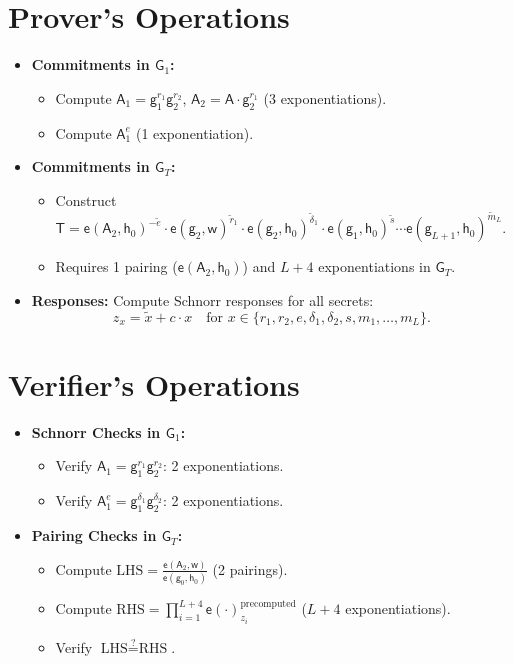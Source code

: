 {\section*{Prover's Operations}
\begin{itemize}
  \item \textbf{Commitments in $\mathsf{G}_1$:}
    \begin{itemize}
      \item Compute $\mathsf{A}_1 = \mathsf{g}_1^{r_1} \mathsf{g}_2^{r_2}$, $\mathsf{A}_2 = \mathsf{A} \cdot \mathsf{g}_2^{r_1}$ (3 exponentiations).
      \item Compute $\mathsf{A}_1^e$ (1 exponentiation).
    \end{itemize}
  \item \textbf{Commitments in $\mathsf{G}_T$:}
    \begin{itemize}
      \item Construct $\mathsf{T} = \mathsf{e}(\mathsf{A}_2, \mathsf{h}_0)^{-\tilde{e}} \cdot \mathsf{e}(\mathsf{g}_2, \mathsf{w})^{\tilde{r}_1} \cdot \mathsf{e}(\mathsf{g}_2, \mathsf{h}_0)^{\tilde{\delta}_1} \cdot \mathsf{e}(\mathsf{g}_1, \mathsf{h}_0)^{\tilde{s}} \cdots \mathsf{e}(\mathsf{g}_{L+1}, \mathsf{h}_0)^{\tilde{m}_L}$.
      \item Requires 1 pairing ($\mathsf{e}(\mathsf{A}_2, \mathsf{h}_0)$) and $L+4$ exponentiations in $\mathsf{G}_T$.
    \end{itemize}
  \item \textbf{Responses:} Compute Schnorr responses for all secrets:
    \[
    z_x = \tilde{x} + c \cdot x \quad \text{for } x \in \{r_1, r_2, e, \delta_1, \delta_2, s, m_1, \dots, m_L\}.
    \]
\end{itemize}

\section*{Verifier's Operations}
\begin{itemize}
  \item \textbf{Schnorr Checks in $\mathsf{G}_1$:}
    \begin{itemize}
      \item Verify $\mathsf{A}_1 = \mathsf{g}_1^{r_1} \mathsf{g}_2^{r_2}$: 2 exponentiations.
      \item Verify $\mathsf{A}_1^e = \mathsf{g}_1^{\delta_1} \mathsf{g}_2^{\delta_2}$: 2 exponentiations.
    \end{itemize}
  \item \textbf{Pairing Checks in $\mathsf{G}_T$:}
    \begin{itemize}
      \item Compute $\text{LHS} = \frac{\mathsf{e}(\mathsf{A}_2, \mathsf{w})}{\mathsf{e}(\mathsf{g}_0, \mathsf{h}_0)}$ (2 pairings).
      \item Compute $\text{RHS} = \prod_{i=1}^{L+4} \mathsf{e}(\cdot)^{\text{precomputed}}_{z_i}$ ($L+4$ exponentiations).
      \item Verify $\text{LHS} \stackrel{?}{=} \text{RHS}$.
    \end{itemize}
\end{itemize}

}

